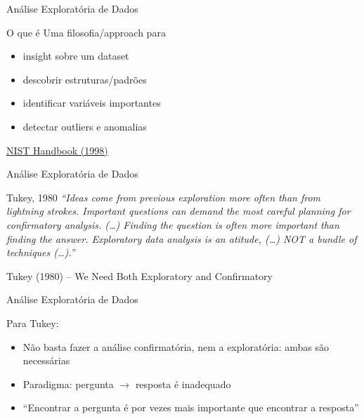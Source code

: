 \documentclass{beamer}
\begin{document}
\begin{frame}{Análise Exploratória de Dados}
  \begin{block}{O que é}
    \scriptsize
    Uma filosofia/approach para

    \bigskip
    \begin{itemize}
      \footnotesize
    \item insight sobre um dataset
      \medskip
    \item descobrir estruturas/padrões
      \medskip
    \item identificar variáveis importantes
      \medskip
    \item detectar outliers e anomalias
    \end{itemize}
  \end{block}

  \vfill
  \scriptsize
  \hfill \href{https://www.itl.nist.gov/div898/handbook/eda/section1/eda16.htm}
  {NIST Handbook (1998)}
\end{frame}

\begin{frame}{Análise Exploratória de Dados}
  \begin{block}{Tukey, 1980}
    \footnotesize {\em ``Ideas come from previous exploration more
      often than from lightning strokes. Important questions can
      demand the most careful planning for confirmatory
      analysis. (\ldots) \alert<2>{Finding the question is often more
        important than finding the answer.} Exploratory data analysis
      is an atitude, (\ldots) NOT a bundle of techniques (\ldots).''}
  \end{block}

  \vfill
  \scriptsize
  \hfill Tukey (1980) -- We Need Both Exploratory and Confirmatory
\end{frame}

\begin{frame}{Análise Exploratória de Dados}
  \begin{block}{Para Tukey:}
  \begin{itemize}
    \footnotesize
  \item Não basta fazer a análise confirmatória, nem a exploratória:
    \alert{ambas} são necessárias
    \bigskip
  \item Paradigma: pergunta $\rightarrow$ resposta é inadequado
    \bigskip
  \item ``Encontrar a pergunta é por vezes mais importante que
    encontrar a resposta''
  \end{itemize}
\end{block}
\end{frame}
\end{document}
